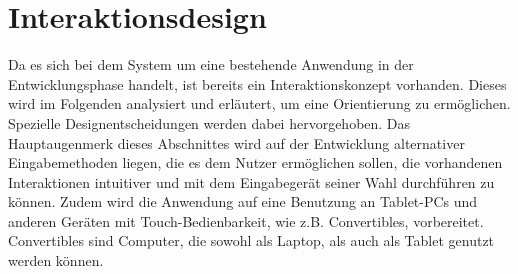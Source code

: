 \chapter{Interaktionsdesign}
Da es sich bei dem System um eine bestehende Anwendung in der Entwicklungsphase handelt, ist bereits ein Interaktionskonzept vorhanden. Dieses wird im Folgenden analysiert und erläutert, um eine Orientierung zu ermöglichen. Spezielle Designentscheidungen werden dabei hervorgehoben. Das Hauptaugenmerk dieses Abschnittes wird auf der Entwicklung alternativer Eingabemethoden liegen, die es dem Nutzer ermöglichen sollen, die vorhandenen Interaktionen intuitiver und mit dem Eingabegerät seiner Wahl durchführen zu können. Zudem wird die Anwendung auf eine Benutzung an Tablet-PCs und anderen Geräten mit Touch-Bedienbarkeit, wie z.B. Convertibles, vorbereitet. Convertibles sind Computer, die sowohl als Laptop, als auch als Tablet genutzt werden können.\par
